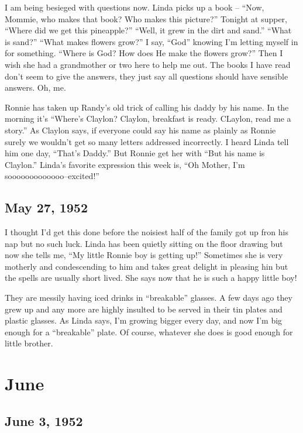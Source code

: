 \documentclass[
]{book}
\begin{document}
I am being besieged with questions now. Linda picks up a book -- ``Now, Mommie, who makes that book? Who makes this picture?'' Tonight at supper, ``Where did we get this pineapple?'' ``Well, it grew in the dirt and sand.'' ``What is sand?'' ``What makes flowers grow?'' I say, ``God'' knowing I'm letting myself in for something. ``Where is God? How does He make the flowers grow?'' Then I wish she had a grandmother or two here to help me out. The books I have read don't seem to give the answers, they just say all questions should have sensible answers. Oh, me.

Ronnie has taken up Randy's old trick of calling his daddy by his name. In the morning it's ``Where's Claylon? Claylon, breakfast is ready. CLaylon, read me a story.'' As Claylon says, if everyone could say his name as plainly as Ronnie surely we wouldn't get so many letters addressed incorrectly. I heard Linda tell him one day, ``That's Daddy.'' But Ronnie get her with ``But his name is Claylon.'' Linda's favorite expression this week is, ``Oh Mother, I'm sooooooooooooo--excited!''

\hypertarget{may-27-1952}{%
\subsection{May 27, 1952}\label{may-27-1952}}

I thought I'd get this done before the noisiest half of the family got up fron his nap but no such luck. Linda has been quietly sitting on the floor drawing but now she tells me, ``My little Ronnie boy is getting up!'' Sometimes she is very motherly and condescending to him and takes great delight in pleasing hin but the spells are usually short lived. She says now that he is such a happy little boy!

They are messily having iced drinks in ``breakable'' glasses. A few days ago they grew up and any more are highly insulted to be served in their tin plates and plastic glasses. As Linda says, I'm growing bigger
every day, and now I'm big enough for a ``breakable'' plate. Of course, whatever she does is good enough for little brother.

\hypertarget{june-1}{%
\section{June}\label{june-1}}

\hypertarget{june-3-1952}{%
\subsection{June 3, 1952}\label{june-3-1952}}
\end{document}
